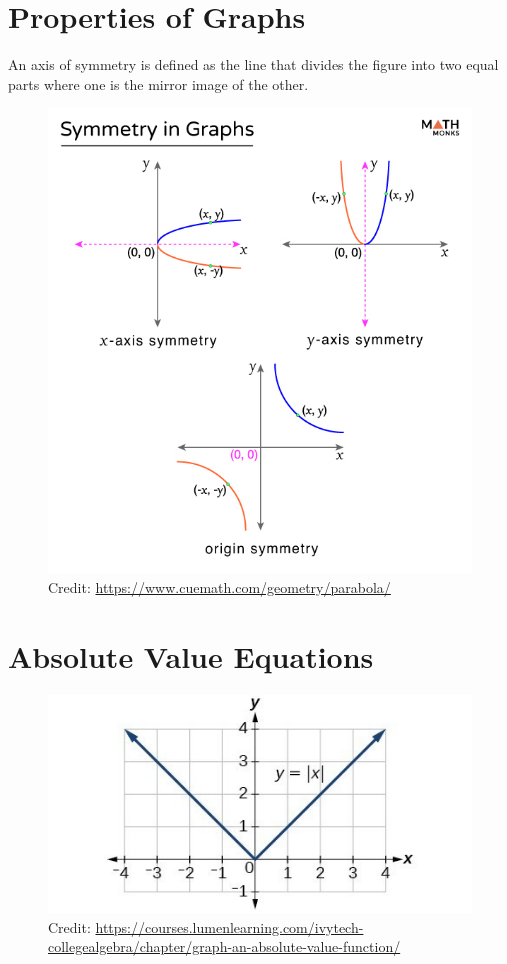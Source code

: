 \documentclass[12pt]{article}
\begin{document}
\section{Properties of Graphs}

An axis of symmetry is defined as the line that divides the figure into two equal parts where one is the mirror image of the other.\\

\begin{figure}[H]
	\centering
	\includegraphics[scale=0.4]{Graph-Symmetry.jpg}
	\caption{Credit: \url{https://www.cuemath.com/geometry/parabola/}}
\end{figure}

\section{Absolute Value Equations}

\begin{figure}[H]
	\centering
	\includegraphics[scale=0.3]{CNX_Precalc_Figure_01_06_0032.jpg}
	\caption{Credit: \url{https://courses.lumenlearning.com/ivytech-collegealgebra/chapter/graph-an-absolute-value-function/}}
\end{figure}
\end{document}
